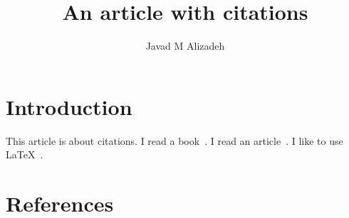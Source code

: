 \documentclass{article}
\title{An article with citations}
\author{Javad M Alizadeh}
\date{}
\begin{document}
\maketitle
	
\section{Introduction}


This article is about citations. I read a book~\cite{smith2012}. I read an article~\cite{hall2013}. I like to use \LaTeX~\cite{latex}.

\section{References}


	
	
\end{document}
